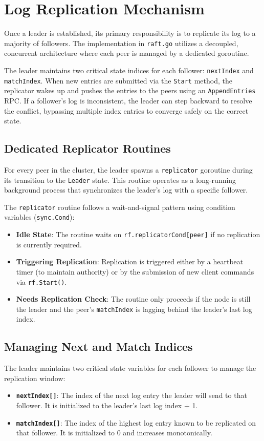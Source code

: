 \section{Log Replication Mechanism}
\label{sec:log_replication_impl}
Once a leader is established, its primary responsibility is to replicate its log to a majority of followers. The implementation in \texttt{raft.go} utilizes a decoupled, concurrent architecture where each peer is managed by a dedicated goroutine.

The leader maintains two critical state indices for each follower: \texttt{nextIndex} and \texttt{matchIndex}. When new entries are submitted via the \texttt{Start} method, the replicator wakes up and pushes the entries to the peers using an \texttt{AppendEntries} RPC. If a follower's log is inconsistent, the leader can step backward to resolve the conflict, bypassing multiple index entries to converge safely on the correct state.

\subsection{Dedicated Replicator Routines}
For every peer in the cluster, the leader spawns a \texttt{replicator} goroutine during its transition to the \texttt{Leader} state. This routine operates as a long-running background process that synchronizes the leader's log with a specific follower.

The \texttt{replicator} routine follows a wait-and-signal pattern using condition variables (\texttt{sync.Cond}):
\begin{itemize}
    \item \textbf{Idle State}: The routine waits on \texttt{rf.replicatorCond[peer]} if no replication is currently required.
    \item \textbf{Triggering Replication}: Replication is triggered either by a heartbeat timer (to maintain authority) or by the submission of new client commands via \texttt{rf.Start()}.
    \item \textbf{Needs Replication Check}: The routine only proceeds if the node is still the leader and the peer's \texttt{matchIndex} is lagging behind the leader's last log index.
\end{itemize}

\subsection{Managing Next and Match Indices}
The leader maintains two critical state variables for each follower to manage the replication window:
\begin{itemize}
    \item \textbf{\texttt{nextIndex[]}}: The index of the next log entry the leader will send to that follower. It is initialized to the leader's last log index + 1.
    \item \textbf{\texttt{matchIndex[]}}: The index of the highest log entry known to be replicated on that follower. It is initialized to 0 and increases monotonically.
\end{itemize}


